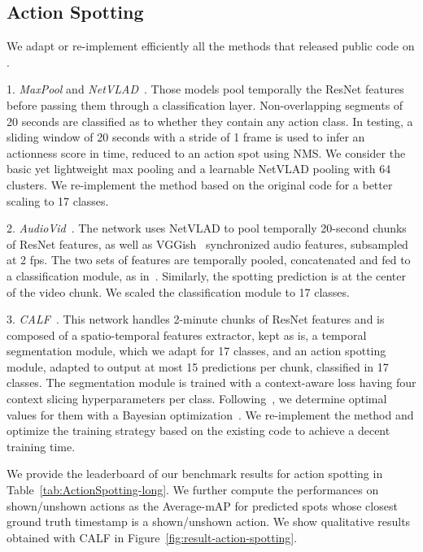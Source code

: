 \documentclass[final]{cvsports}
\begin{document}
\subsection{Action Spotting}

We adapt or re-implement efficiently all the methods that released public code on \SoccerNet. 


1. \emph{MaxPool} and \emph{NetVLAD}~\cite{Giancola_2018_CVPR_Workshops}.
Those models pool temporally the ResNet features before passing them through a classification layer. Non-overlapping segments of 20 seconds are classified as to whether they contain any action class. In testing, a sliding window of 20 seconds with a stride of 1 frame is used to infer an actionness score in time, reduced to an action spot using NMS. We consider the basic yet lightweight max pooling and a learnable NetVLAD pooling with 64 clusters. We re-implement the method based on the original code for a better scaling to 17 classes. 

2. \emph{AudioVid}~\cite{Vanderplaetse2020Improved}. The network uses NetVLAD to pool temporally 20-second chunks of ResNet features, as well as VGGish~\cite{Hershey2017CNN} synchronized audio features, subsampled at 2 fps. The two sets of features are temporally pooled, concatenated and fed to a classification module, as in~\cite{Giancola_2018_CVPR_Workshops}. 
Similarly, the spotting prediction is at the center of the video chunk.
We scaled the classification module to 17 classes.


3. \emph{CALF}~\cite{cioppa2020context}.
This network handles 2-minute chunks of ResNet features and is composed of a spatio-temporal features extractor, kept as is, a temporal segmentation module, which we adapt for 17 classes, and an action spotting module, adapted to output at most 15 predictions per chunk, classified in 17 classes. 
The segmentation module is trained with a context-aware loss having four context slicing hyperparameters per class.
Following~\cite{cioppa2020context}, we determine optimal values for them with a Bayesian optimization~\cite{BayesianOpt}. 
We re-implement the method and optimize the training strategy based on the existing code to achieve a decent training time.


We provide the leaderboard of our benchmark results for action spotting in Table~\ref{tab:ActionSpotting-long}. 
We further compute the performances on shown/unshown actions as the Average-mAP for predicted spots whose closest ground truth timestamp is a shown/unshown action.  We show qualitative results obtained with CALF in Figure~\ref{fig:result-action-spotting}. 
\end{document}
